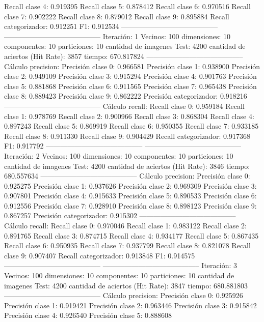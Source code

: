 Recall clase 4: 0.919395
Recall clase 5: 0.878412
Recall clase 6: 0.970516
Recall clase 7: 0.902222
Recall clase 8: 0.879012
Recall clase 9: 0.895884
Recall categorizador: 0.912251
F1: 0.912534
-----------------------------------------
-----------------------------------------
Iteración: 1
Vecinos: 100
dimensiones: 10
componentes: 10
particiones: 10
cantidad de imagenes Test: 4200
cantidad de aciertos (Hit Rate): 3857
tiempo: 670.817824
-----------------------------------------
Cálculo precision: 
Precisión clase 0: 0.966581
Precisión clase 1: 0.938900
Precisión clase 2: 0.949109
Precisión clase 3: 0.915294
Precisión clase 4: 0.901763
Precisión clase 5: 0.881868
Precisión clase 6: 0.911565
Precisión clase 7: 0.965438
Precisión clase 8: 0.889423
Precisión clase 9: 0.862222
Precisión categorizador: 0.918216
-----------------------------------------
Cálculo recall: 
Recall clase 0: 0.959184
Recall clase 1: 0.978769
Recall clase 2: 0.900966
Recall clase 3: 0.868304
Recall clase 4: 0.897243
Recall clase 5: 0.869919
Recall clase 6: 0.950355
Recall clase 7: 0.933185
Recall clase 8: 0.911330
Recall clase 9: 0.904429
Recall categorizador: 0.917368
F1: 0.917792
-----------------------------------------
-----------------------------------------
Iteración: 2
Vecinos: 100
dimensiones: 10
componentes: 10
particiones: 10
cantidad de imagenes Test: 4200
cantidad de aciertos (Hit Rate): 3846
tiempo: 680.557634
-----------------------------------------
Cálculo precision: 
Precisión clase 0: 0.925275
Precisión clase 1: 0.937626
Precisión clase 2: 0.969309
Precisión clase 3: 0.907801
Precisión clase 4: 0.915633
Precisión clase 5: 0.890533
Precisión clase 6: 0.912556
Precisión clase 7: 0.928910
Precisión clase 8: 0.898123
Precisión clase 9: 0.867257
Precisión categorizador: 0.915302
-----------------------------------------
Cálculo recall: 
Recall clase 0: 0.970046
Recall clase 1: 0.983122
Recall clase 2: 0.891765
Recall clase 3: 0.874715
Recall clase 4: 0.934177
Recall clase 5: 0.867435
Recall clase 6: 0.950935
Recall clase 7: 0.937799
Recall clase 8: 0.821078
Recall clase 9: 0.907407
Recall categorizador: 0.913848
F1: 0.914575
-----------------------------------------
-----------------------------------------
Iteración: 3
Vecinos: 100
dimensiones: 10
componentes: 10
particiones: 10
cantidad de imagenes Test: 4200
cantidad de aciertos (Hit Rate): 3847
tiempo: 680.881803
-----------------------------------------
Cálculo precision: 
Precisión clase 0: 0.925926
Precisión clase 1: 0.919421
Precisión clase 2: 0.963446
Precisión clase 3: 0.915842
Precisión clase 4: 0.926540
Precisión clase 5: 0.888608

